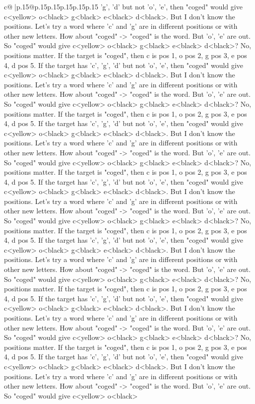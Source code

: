 \documentclass{article}
\begin{document}
{\begin{supertabular}{c@{$\;$}|p{.15\linewidth}@{}p{.15\linewidth}p{.15\linewidth}p{.15\linewidth}p{.15\linewidth}p{.15\linewidth}}
{{{'g', 'd' but not 'o', 'e', then "coged" would give c<yellow> o<black> g<black> e<black> d<black>. But I don't know the positions. Let's try a word where 'c' and 'g' are in different positions or with other new letters. How about "coged" {-}> "coged" is the word. But 'o', 'e' are out. So "coged" would give c<yellow> o<black> g<black> e<black> d<black>? No, positions matter. If the target is "coged", then c is pos 1, o pos 2, g pos 3, e pos 4, d pos 5. If the target has 'c', 'g', 'd' but not 'o', 'e', then "coged" would give c<yellow> o<black> g<black> e<black> d<black>. But I don't know the positions. Let's try a word where 'c' and 'g' are in different positions or with other new letters. How about "coged" {-}> "coged" is the word. But 'o', 'e' are out. So "coged" would give c<yellow> o<black> g<black> e<black> d<black>? No, positions matter. If the target is "coged", then c is pos 1, o pos 2, g pos 3, e pos 4, d pos 5. If the target has 'c', 'g', 'd' but not 'o', 'e', then "coged" would give c<yellow> o<black> g<black> e<black> d<black>. But I don't know the positions. Let's try a word where 'c' and 'g' are in different positions or with other new letters. How about "coged" {-}> "coged" is the word. But 'o', 'e' are out. So "coged" would give c<yellow> o<black> g<black> e<black> d<black>? No, positions matter. If the target is "coged", then c is pos 1, o pos 2, g pos 3, e pos 4, d pos 5. If the target has 'c', 'g', 'd' but not 'o', 'e', then "coged" would give c<yellow> o<black> g<black> e<black> d<black>. But I don't know the positions. Let's try a word where 'c' and 'g' are in different positions or with other new letters. How about "coged" {-}> "coged" is the word. But 'o', 'e' are out. So "coged" would give c<yellow> o<black> g<black> e<black> d<black>? No, positions matter. If the target is "coged", then c is pos 1, o pos 2, g pos 3, e pos 4, d pos 5. If the target has 'c', 'g', 'd' but not 'o', 'e', then "coged" would give c<yellow> o<black> g<black> e<black> d<black>. But I don't know the positions. Let's try a word where 'c' and 'g' are in different positions or with other new letters. How about "coged" {-}> "coged" is the word. But 'o', 'e' are out. So "coged" would give c<yellow> o<black> g<black> e<black> d<black>? No, positions matter. If the target is "coged", then c is pos 1, o pos 2, g pos 3, e pos 4, d pos 5. If the target has 'c', 'g', 'd' but not 'o', 'e', then "coged" would give c<yellow> o<black> g<black> e<black> d<black>. But I don't know the positions. Let's try a word where 'c' and 'g' are in different positions or with other new letters. How about "coged" {-}> "coged" is the word. But 'o', 'e' are out. So "coged" would give c<yellow> o<black> g<black> e<black> d<black>? No, positions matter. If the target is "coged", then c is pos 1, o pos 2, g pos 3, e pos 4, d pos 5. If the target has 'c', 'g', 'd' but not 'o', 'e', then "coged" would give c<yellow> o<black> g<black> e<black> d<black>. But I don't know the positions. Let's try a word where 'c' and 'g' are in different positions or with other new letters. How about "coged" {-}> "coged" is the word. But 'o', 'e' are out. So "coged" would give c<yellow> o<black> }}}
\end{supertabular}}
\end{document}

